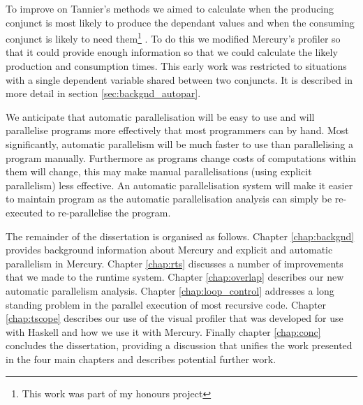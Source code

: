 To improve on Tannier's methods we aimed to calculate when the
producing conjunct is most likely to produce the dependant values and
when the consuming conjunct is likely to need them\footnote{
    This work was part of my honours project}
\citep*{bone:2008:hons}.
To do this we modified Mercury's profiler so that it could provide enough
information so that we could calculate the likely production and
consumption times.
This early work was restricted to situations with a
single dependent variable shared between two conjuncts.
It is described in more detail in section \ref{sec:backgnd_autopar}.

We anticipate that automatic parallelisation will be easy to use and
will parallelise programs more effectively that most programmers can by
hand.
Most significantly,
automatic parallelism will be much faster to use than parallelising a
program manually.
Furthermore as programs change costs of computations within them will 
change,
this may make manual parallelisations (using explicit parallelism) less
effective.
An automatic parallelisation system will make it easier to maintain
program as the automatic parallelisation analysis can simply be
re-executed to re-parallelise the program.

The remainder of the dissertation is organised as follows.
Chapter \ref{chap:backgnd} provides background information about
Mercury and explicit and automatic parallelism in Mercury.
Chapter \ref{chap:rts} discusses a number of improvements that we made to
the runtime system.
Chapter \ref{chap:overlap} describes our new automatic parallelism
analysis.
Chapter \ref{chap:loop_control} addresses a long standing problem in the
parallel execution of most recursive code.
Chapter \ref{chap:tscope} describes our use of the \tscope visual
profiler that was developed for use with Haskell and how we use it with
Mercury.
Finally chapter \ref{chap:conc} concludes the dissertation, providing a
discussion that unifies the work presented in the four main chapters and
describes potential further work.

